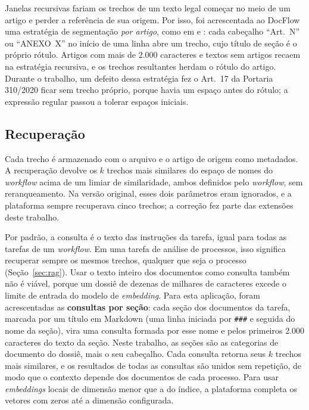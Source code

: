 Janelas recursivas fariam os trechos de um texto legal começar no meio de um artigo e perder a referência de sua origem. Por isso, foi acrescentada ao DocFlow uma estratégia de segmentação \textit{por artigo}, como em  e : cada cabeçalho ``Art.~N'' ou ``ANEXO~X'' no início de uma linha abre um trecho, cujo título de seção é o próprio rótulo. Artigos com mais de 2.000 caracteres e textos sem artigos recaem na estratégia recursiva, e os trechos resultantes herdam o rótulo do artigo. Durante o trabalho, um defeito dessa estratégia fez o Art.~17 da Portaria 310/2020 ficar sem trecho próprio, porque havia um espaço antes do rótulo; a expressão regular passou a tolerar espaços iniciais.

\subsection{Recuperação}

Cada trecho é armazenado com o arquivo e o artigo de origem como metadados. A recuperação devolve os $k$ trechos mais similares do espaço de nomes do \textit{workflow} acima de um limiar de similaridade, ambos definidos pelo \textit{workflow}, sem reranqueamento. Na versão original, esses dois parâmetros eram ignorados, e a plataforma sempre recuperava cinco trechos; a correção fez parte das extensões deste trabalho.

Por padrão, a consulta é o texto das instruções da tarefa, igual para todas as tarefas de um \textit{workflow}. Em uma tarefa de análise de processos, isso significa recuperar sempre os mesmos trechos, qualquer que seja o processo (Seção~\ref{sec:rag}). Usar o texto inteiro dos documentos como consulta também não é viável, porque um dossiê de dezenas de milhares de caracteres excede o limite de entrada do modelo de \textit{embedding}. Para esta aplicação, foram acrescentadas as \textbf{consultas por seção}: cada seção dos documentos da tarefa, marcada por um título em Markdown (uma linha iniciada por \texttt{\#\#\#} e seguida do nome da seção), vira uma consulta formada por esse nome e pelos primeiros 2.000 caracteres do texto da seção. Neste trabalho, as seções são as categorias de documento do dossiê, mais o seu cabeçalho. Cada consulta retorna seus $k$ trechos mais similares, e os resultados de todas as consultas são unidos sem repetição, de modo que o contexto depende dos documentos de cada processo. Para usar \textit{embeddings} locais de dimensão menor que a do índice, a plataforma completa os vetores com zeros até a dimensão configurada.

